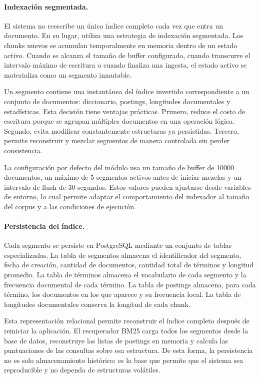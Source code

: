\documentclass[11pt]{article}
\begin{document}
\paragraph{Indexación segmentada.}
El sistema no reescribe un único índice completo cada vez que entra un documento. En su lugar,
utiliza una estrategia de indexación segmentada. Los chunks nuevos se acumulan temporalmente en
memoria dentro de un estado activo. Cuando se alcanza el tamaño de buffer configurado, cuando
transcurre el intervalo máximo de escritura o cuando finaliza una ingesta, el estado activo se
materializa como un segmento inmutable.

Un segmento contiene una instantánea del índice invertido correspondiente a un conjunto de
documentos: diccionario, postings, longitudes documentales y estadísticas. Esta decisión tiene
ventajas prácticas. Primero, reduce el costo de escritura porque se agrupan múltiples documentos
en una operación lógica. Segundo, evita modificar constantemente estructuras ya persistidas.
Tercero, permite reconstruir y mezclar segmentos de manera controlada sin perder consistencia.

La configuración por defecto del módulo usa un tamaño de buffer de 10000 documentos, un máximo
de 5 segmentos activos antes de iniciar mezclas y un intervalo de flush de 30 segundos. Estos
valores pueden ajustarse desde variables de entorno, lo cual permite adaptar el comportamiento
del indexador al tamaño del corpus y a las condiciones de ejecución.

\paragraph{Persistencia del índice.}
Cada segmento se persiste en PostgreSQL mediante un conjunto de tablas especializadas. La tabla
de segmentos almacena el identificador del segmento, fecha de creación, cantidad de documentos,
cantidad total de términos y longitud promedio. La tabla de términos almacena el vocabulario de
cada segmento y la frecuencia documental de cada término. La tabla de postings almacena, para
cada término, los documentos en los que aparece y su frecuencia local. La tabla de longitudes
documentales conserva la longitud de cada chunk.

Esta representación relacional permite reconstruir el índice completo después de reiniciar la
aplicación. El recuperador BM25 carga todos los segmentos desde la base de datos, reconstruye las
listas de postings en memoria y calcula las puntuaciones de las consultas sobre esa estructura.
De esta forma, la persistencia no es solo almacenamiento histórico: es la base que permite que el
sistema sea reproducible y no dependa de estructuras volátiles.
\end{document}
